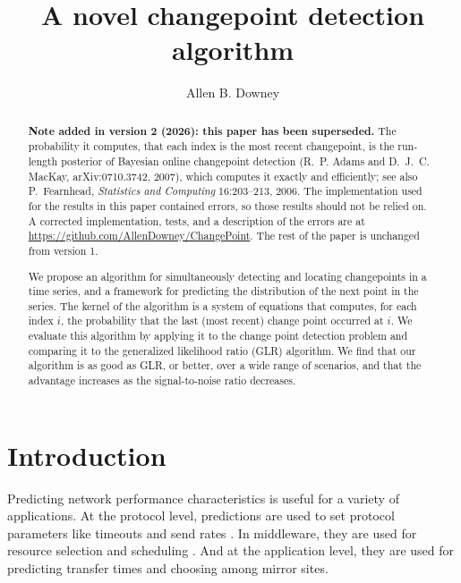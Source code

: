 \documentclass[twocolumn,11pt]{article}
\begin{document}
\title{A novel changepoint detection algorithm}

\author{Allen B. Downey}

\date{}

\maketitle

\begin{abstract}

\textbf{Note added in version 2 (2026): this paper has been superseded.}
The probability it computes, that each index is the most recent
changepoint, is the run-length posterior of Bayesian online
changepoint detection (R.~P. Adams and D.~J.~C. MacKay,
arXiv:0710.3742, 2007), which computes it exactly and efficiently;
see also P.~Fearnhead, \emph{Statistics and Computing} 16:203--213,
2006.  The implementation used for the results in this paper
contained errors, so those results should not be relied on.  A
corrected implementation, tests, and a description of the errors are
at \url{https://github.com/AllenDowney/ChangePoint}.  The rest of the
paper is unchanged from version 1.

\medskip

We propose an algorithm for simultaneously detecting and locating
changepoints in a time series, and a framework for predicting the
distribution of the next point in the series.  The kernel of the
algorithm is a system of equations that computes, for each index $i$,
the probability that the last (most recent) change point occurred at
$i$.  We evaluate this algorithm by applying it to the change point
detection problem and comparing it to the generalized likelihood ratio
(GLR) algorithm.  We find that our algorithm is as good as GLR, or
better, over a wide range of scenarios, and that the advantage
increases as the signal-to-noise ratio decreases.

\end{abstract}

\section{Introduction}
\label {intro}

Predicting network performance characteristics is useful for a variety
of applications.  At the protocol level, predictions are used to
set protocol parameters like timeouts and send rates
\cite{noureddine02transmission}.  In middleware, they are used for
resource selection and scheduling \cite{wolski99network}. And at the
application level, they are used for predicting transfer times and
choosing among mirror sites.
\end{document}
